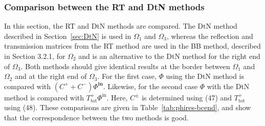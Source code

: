 \documentclass[numreferences]{kluwer}
\renewcommand{\Phi}{\varPhi}
\renewcommand{\vec}[1]{\bm{#1}}
\renewcommand{\Phi}{\varPhi}
\newcommand{\Phiin}{\vec\Phi^{\text{in}}}
\newcommand{\Ttot}{T^+_{\text{tot}}}
\begin{document}
\subsubsection{Comparison between the RT and DtN methods}
\label{sec:RT-DtN}

In this section, the RT and DtN methods are compared. The DtN method
described in Section~\ref{sec:DtN} is used in $\Omega_1$ and
$\Omega_3$, whereas the reflection and transmission matrices from the
RT method are used in the BB method, described in Section 3.2.1, for
$\Omega_2$ and is an alternative to the DtN method for the right end
of $\Omega_3$. Both methods should give identical results at the
border between $\Omega_1$ and $\Omega_2$ and at the right end of
$\Omega_3$. For the first case, $\vec\Phi$ using the DtN method is
compared with $(C^++C^-)\vec\Phiin$. Likewise, for the second case
$\vec\Phi$ with the DtN method is compared with $\Ttot\Phiin$.  Here,
$C^\pm$ is determined using (47) and $\Ttot$ using (48). These
comparisons are given in Table~\ref{tab:phires-bcend}, and show that
the correspondence between the two methods is good.



\end{document}
